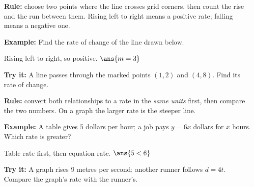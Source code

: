 \documentclass[12pt]{article}
\begin{document}

\begin{formulabox}
\textbf{Rule:} choose two points where the line crosses grid corners, then
count the rise and the run between them. Rising left to right means a positive
rate; falling means a negative one.
\end{formulabox}

\begin{examplebox}
\textbf{Example:} \quad Find the rate of change of the line drawn below.
\begin{center}
\end{center}

Rising left to right, so positive. \quad $\ans{m = 3}$
\end{examplebox}

\begin{tryitbox}
\textbf{Try it:} \quad A line passes through the marked points $(1, 2)$ and
$(4, 8)$. Find its rate of change.\\[2pt]
\end{tryitbox}


\begin{formulabox}
\textbf{Rule:} convert both relationships to a rate in the \emph{same units}
first, then compare the two numbers. On a graph the larger rate is the steeper
line.
\end{formulabox}

\begin{examplebox}
\textbf{Example:} \quad A table gives 5 dollars per hour; a job pays
$y = 6x$ dollars for $x$ hours. Which rate is greater?

Table rate first, then equation rate. \quad $\ans{5 < 6}$
\end{examplebox}

\begin{tryitbox}
\textbf{Try it:} \quad A graph rises 9 metres per second; another runner
follows $d = 4t$. Compare the graph's rate with the runner's.\\[2pt]
\end{tryitbox}
\end{document}
